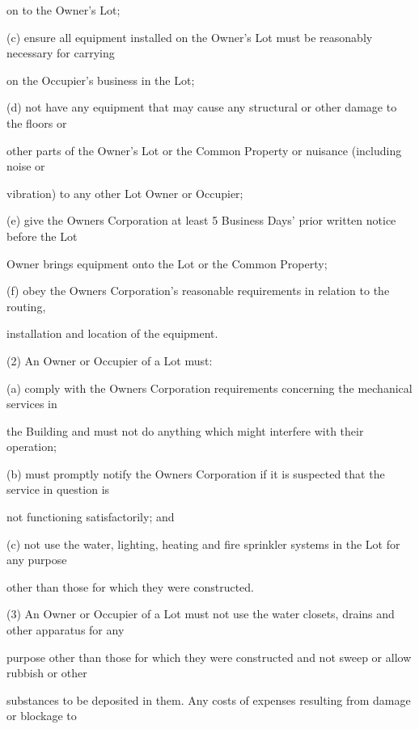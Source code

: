 \documentclass{article}
\begin{document}
{\fontsize{10.02}{1}on to the Owner’s Lot; }

{\fontsize{9.962}{1}(c) ensure all equipment installed on the Owner’s Lot must be reasonably necessary for carrying }

{\fontsize{10.02}{1}on the Occupier’s business in the Lot; }

{\fontsize{9.962}{1}(d) not have any equipment that may cause any structural or other damage to the floors or }

{\fontsize{10.02}{1}other parts of the Owner’s Lot or the Common Property or nuisance (including noise or }

{\fontsize{10.02}{1}vibration) to any other Lot Owner or Occupier; }

{\fontsize{9.962}{1}(e) give the Owners Corporation at least 5 Business Days’ prior written notice before the Lot }

{\fontsize{10.02}{1}Owner brings equipment onto the Lot or the Common Property; }

{\fontsize{9.962}{1}(f) obey the Owners Corporation’s reasonable requirements in relation to the routing, }

{\fontsize{10.02}{1}installation and location of the equipment. }

{\fontsize{9.962}{1}(2) An Owner or Occupier of a Lot must: }

{\fontsize{9.962}{1}(a) comply with the Owners Corporation requirements concerning the mechanical services in }

{\fontsize{10.02}{1}the Building and must not do anything which might interfere with their operation; }

{\fontsize{9.962}{1}(b) must promptly notify the Owners Corporation if it is suspected that the service in question is }

{\fontsize{10.02}{1}not functioning satisfactorily; and }

{\fontsize{9.962}{1}(c) not use the water, lighting, heating and fire sprinkler systems in the Lot for any purpose }

{\fontsize{10.02}{1}other than those for which they were constructed. }

{\fontsize{9.962}{1}(3) An Owner or Occupier of a Lot must not use the water closets, drains and other apparatus for any }

{\fontsize{10.02}{1}purpose other than those for which they were constructed and not sweep or allow rubbish or other }

{\fontsize{10.02}{1}substances to be deposited in them. Any costs of expenses resulting from damage or blockage to }
\end{document}
